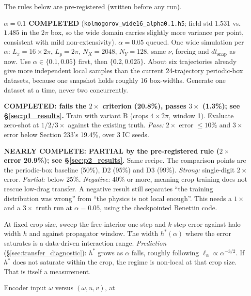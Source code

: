 \documentclass[11pt]{article}
\begin{document}
The rules below are pre-registered (written before any run).
\begin{description}[leftmargin=*]
\item[P0 --- data.] \textbf{$\alpha{=}0.1$ COMPLETED} (\texttt{kolmogorov\_wide16\_alpha0.1.h5}; field std $1.531$ vs.\ $1.485$ in the $2\pi$ box, so the wide domain carries slightly more variance per point, consistent with mild non-extensivity). $\alpha{=}0.05$ queued. One wide simulation per $\alpha$:
  $L_x{=}16\times2\pi$, $L_y{=}2\pi$, $N_X{=}2048$, $N_Y{=}128$, same
  $\nu$, forcing and $dt_{\mathrm{snap}}$ as now. Use
  $\alpha\in\{0.1, 0.05\}$ first, then $\{0.2, 0.025\}$. About six
  trajectories already give more independent local samples than the
  current 24-trajectory periodic-box datasets, because one snapshot holds
  roughly 16 box-widths. Generate one dataset at a time, never two
  concurrently.
\item[P1 --- sanity at $\alpha{=}0.1$.] \textbf{COMPLETED: fails the $2\times$ criterion (20.8\%), passes $3\times$ (1.3\%); see \S\ref{sec:p1_results}.} Train with variant B (crops
  $4\times2\pi$, window 1). Evaluate zero-shot at $1/2/3\times$ against
  the existing truth. \emph{Pass:} $2\times$ error $\le10\%$ and $3\times$
  error below Section 233's 19.4\%, over 3 IC seeds.
\item[P2 --- the real test, $\alpha{=}0.05$.] \textbf{NEARLY COMPLETE: PARTIAL by the pre-registered rule ($2\times$ error 20.9\%); see \S\ref{sec:p2_results}.} Same recipe. The
  comparison points are the periodic-box baseline (50\%), D2 (95\%) and
  D3 (99\%). \emph{Strong:} single-digit $2\times$ error.
  \emph{Partial:} below 25\%. \emph{Negative:} 40\% or more, meaning crop
  training does not rescue low-drag transfer. A negative result still
  separates ``the training distribution was wrong'' from ``the physics is
  not local enough''. This needs a $1\times$ and a $3\times$ truth run at
  $\alpha{=}0.05$, using the checkpointed Benettin code.
\item[P3 --- how local can the model be?] At fixed crop size, sweep the
  free-interior one-step and $k$-step error against halo width $h$ and
  against propagator window. The width $h^*(\alpha)$ where the error
  saturates is a data-driven interaction range. \emph{Prediction}
  (\S\ref{sec:transfer_diagnostic}): $h^*$ grows as $\alpha$ falls,
  roughly following $\ell_\alpha\propto\alpha^{-3/2}$. If $h^*$ does not
  saturate within the crop, the regime is non-local at that crop size.
  That is itself a measurement.
\item[P4 --- inputs.] Encoder input $\omega$ versus $(\omega,u,v)$, at

\end{description}
\end{document}
